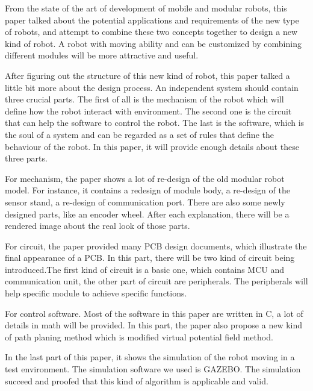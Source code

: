 \begin{englishabstract}
From the state of the art of development of mobile and modular robots, this paper talked about the potential applications and requirements of the new type of robots, and attempt to combine these two concepts together to design a new kind of robot. A robot with moving ability and can be customized by combining different modules will be more attractive and useful.

After figuring out the structure of this new kind of robot, this paper talked a little bit more about the design process. An independent system should contain three crucial parts. The first of all is the mechanism of the robot which will define how the robot interact with environment. The second one is the circuit that can help the software to control the robot. The last is the software, which is the soul of a system and can be regarded as a set of rules that define the behaviour of the robot. In this paper, it will provide enough details about these three parts.

For mechanism, the paper shows a lot of re-design of the old modular robot model. For instance, it contains a redesign of module body, a re-design of the sensor stand, a re-design of communication port. There are also some newly designed parts, like an encoder wheel. After each explanation, there will be a rendered image about the real look of those parts.

For circuit, the paper provided many PCB design documents, which illustrate the final appearance of a PCB. In this part, there will be two kind of circuit being introduced.The first kind of circuit is a basic one, which contains MCU and communication unit, the other part of circuit are peripherals. The peripherals will help specific module to achieve specific functions.

For control software. Most of the software in this paper are written in C, a lot of details in math will be provided. In this part, the paper also propose a new kind of path planing method which is modified virtual potential field method. 

In the last part of this paper, it shows the simulation of the robot moving in a test environment. The simulation software we used is GAZEBO. The simulation succeed and proofed that this kind of algorithm is applicable and valid.


\end{englishabstract}
